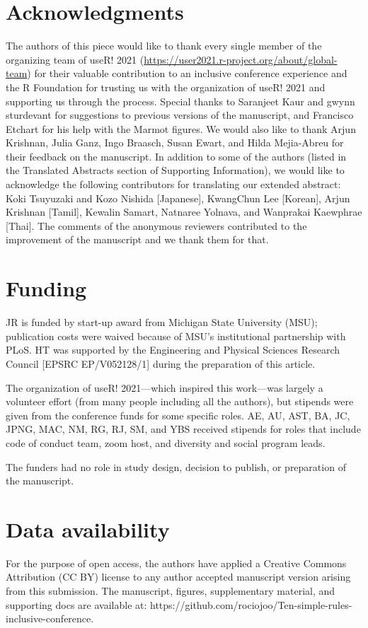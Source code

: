 \documentclass[10pt,letterpaper]{article}
\begin{document}
\section*{Acknowledgments}
The authors of this piece would like to thank every single member of the organizing team of useR! 2021 (\url{https://user2021.r-project.org/about/global-team}) for their valuable contribution to an inclusive conference experience and the R Foundation for trusting us with the organization of useR! 2021 and supporting us through the process. Special thanks to Saranjeet Kaur and gwynn sturdevant for suggestions to previous versions of the manuscript, and Francisco Etchart for his help with the Marmot figures. We would also like to thank Arjun Krishnan, Julia Ganz, Ingo Braasch, Susan Ewart, and Hilda Mejia-Abreu for their feedback on the manuscript. In addition to some of the authors (listed in the Translated Abstracts section of Supporting Information), we would like to acknowledge the following contributors for translating our extended abstract: Koki Tsuyuzaki and Kozo Nishida [Japanese], KwangChun Lee [Korean], Arjun Krishnan [Tamil], Kewalin Samart, Natnaree Yolnava, and Wanprakai Kaewphrae [Thai].
The comments of the anonymous reviewers contributed to the improvement of the manuscript and we thank them for that.

\section*{Funding}

JR is funded by start-up award from Michigan State University (MSU); publication costs were waived because of MSU’s institutional partnership with PLoS. HT was supported by the Engineering and Physical Sciences Research Council [EPSRC EP/V052128/1] during the preparation of this article.

The organization of useR! 2021---which inspired this work---was largely a volunteer effort (from many people including all the authors), but stipends were given from the conference funds for some specific roles.
AE, AU, AST, BA, JC, JPNG, MAC, NM, RG, RJ, SM, and YBS received stipends for roles that include code of conduct team, zoom host, and diversity and social program leads.

The funders had no role in study design, decision to publish, or preparation of the manuscript.


\section*{Data availability}
For the purpose of open access, the authors have applied a Creative Commons Attribution (CC BY) license to any author accepted manuscript version arising from this submission. The manuscript, figures, supplementary material, and supporting docs are available at: https://github.com/rociojoo/Ten-simple-rules-inclusive-conference.
\end{document}
